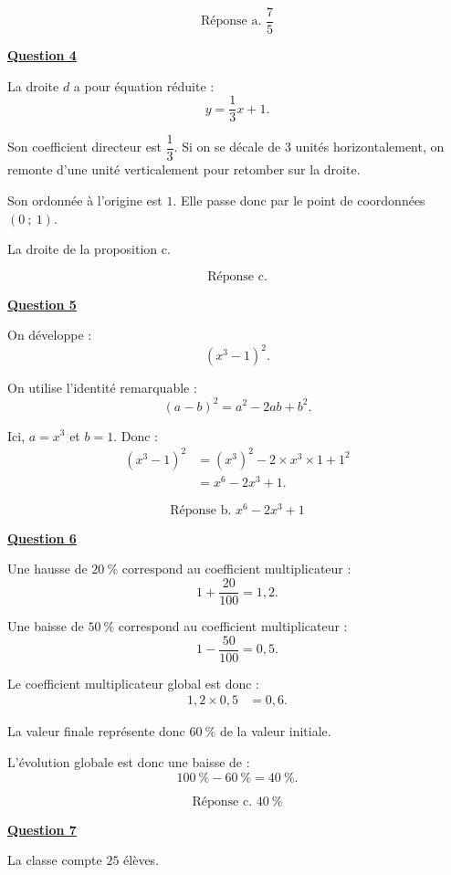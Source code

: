 \documentclass[10pt]{article}
\begin{document}
			\[
			\boxed{\text{Réponse a. }\dfrac75}
			\]
			
			\medskip
			\textbf{\underline{Question 4}}
			
			\medskip
			La droite $d$ a pour équation réduite :
			\[
			y=\frac13x+1.
			\]
			
			Son coefficient directeur est $\dfrac13$. Si on se décale de 3 unités horizontalement, on remonte d'une unité verticalement pour retomber sur la droite.
			
			Son ordonnée à l'origine est $1$. Elle passe donc par le point de coordonnées $(0\ ;\ 1)$.
			
			La droite de la proposition c.
			
			\[
			\boxed{\text{Réponse c.}}
			\]
			
			\medskip
			\textbf{\underline{Question 5}}
			
			\medskip
			On développe :
			\[
			(x^3-1)^2.
			\]
			
			On utilise l'identité remarquable :
			\[
			(a-b)^2=a^2-2ab+b^2.
			\]
			
			Ici, $a=x^3$ et $b=1$. Donc :
			\begin{align*}
				(x^3-1)^2
				&=(x^3)^2-2\times x^3\times 1+1^2\\
				&=x^6-2x^3+1.
			\end{align*}
			
			\[
			\boxed{\text{Réponse b. }x^6-2x^3+1}
			\]
			
			\medskip
			\textbf{\underline{Question 6}}
			
			\medskip
			Une hausse de $20\ \%$ correspond au coefficient multiplicateur :
			\[
			1+\frac{20}{100}=1{,}2.
			\]
			
			Une baisse de $50\ \%$ correspond au coefficient multiplicateur :
			\[
			1-\frac{50}{100}=0{,}5.
			\]
			
			Le coefficient multiplicateur global est donc :
			\begin{align*}
				1{,}2\times 0{,}5&=0{,}6.
			\end{align*}
			
			La valeur finale représente donc $60\ \%$ de la valeur initiale.
			
			L'évolution globale est donc une baisse de :
			\[
			100\ \%-60\ \%=40\ \%.
			\]
			
			\[
			\boxed{\text{Réponse c. }40\ \%}
			\]
			
			\medskip
			\textbf{\underline{Question 7}}
			
			\medskip
			La classe compte $25$ élèves.
			
\end{document}
